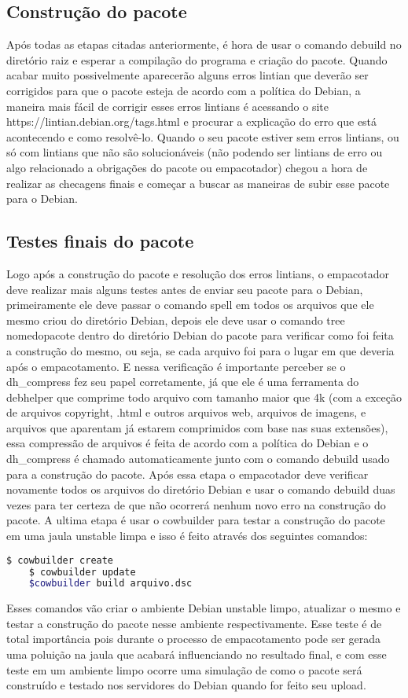 \subsection{Construção do pacote}

Após todas as etapas citadas anteriormente, é hora de usar o comando debuild no diretório raiz e esperar a compilação do programa e criação do pacote. Quando acabar muito possivelmente aparecerão alguns erros lintian que deverão ser corrigidos para que o pacote esteja de acordo com a política do Debian, a maneira mais fácil de corrigir esses erros lintians é acessando o site https://lintian.debian.org/tags.html e procurar a explicação do erro que está acontecendo e como resolvê-lo. Quando o seu pacote estiver sem erros lintians, ou só com lintians que não são solucionáveis (não podendo ser lintians de erro ou algo relacionado a obrigações do pacote ou empacotador) chegou a hora de realizar as checagens finais e começar a buscar as maneiras de subir esse pacote para o Debian.

\subsection{Testes finais do pacote}

Logo após a construção do pacote e resolução dos erros lintians, o empacotador deve realizar mais alguns testes antes de enviar seu pacote para o Debian, primeiramente ele deve passar o comando spell em todos os arquivos que ele mesmo criou do diretório Debian, depois ele deve usar o comando tree nomedopacote dentro do diretório Debian do pacote para verificar como foi feita a construção do mesmo, ou seja, se cada arquivo foi para o lugar em que deveria após o empacotamento. E nessa verificação é importante perceber se o dh\_compress fez seu papel corretamente, já que ele é uma ferramenta do debhelper que comprime todo arquivo com tamanho maior que 4k (com a exceção de arquivos copyright, .html e outros arquivos web, arquivos de imagens, e arquivos que aparentam já estarem comprimidos com base nas suas extensões), essa compressão de arquivos é feita de acordo com a política do Debian e o dh\_compress é chamado automaticamente junto com o comando debuild usado para a construção do pacote. Após essa etapa o empacotador deve verificar novamente todos os arquivos do diretório Debian e usar o comando debuild duas vezes para ter certeza de que não ocorrerá nenhum novo erro na construção do pacote. A ultima etapa é usar o cowbuilder para testar a construção do pacote em uma jaula unstable limpa e isso é feito através dos seguintes comandos:

\begin{lstlisting}[language=bash]
	$ cowbuilder create
	$ cowbuilder update
	$cowbuilder build arquivo.dsc
\end{lstlisting} 

Esses comandos vão criar o ambiente Debian unstable limpo, atualizar o mesmo e testar a construção do pacote nesse ambiente respectivamente. Esse teste é de total importância pois durante o processo de empacotamento pode ser gerada uma poluição na jaula que acabará influenciando no resultado final, e com esse teste em um ambiente limpo ocorre uma simulação de como o pacote será construído e testado nos servidores do Debian quando for feito seu upload.